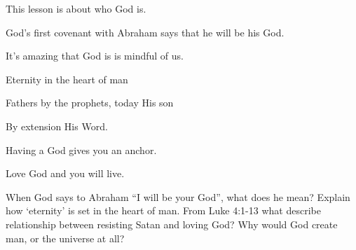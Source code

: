 \begin{discussion}

This lesson is about who God is.

 God's first covenant with Abraham says that he will be his God.


	 It's amazing that God is is mindful of us.


	 Eternity in the heart of man

   Fathers by the prophets, today His son
	
	By extension His Word.


	 Having a God gives you an anchor. 
	
	 Love God and you will live.

\end{discussion}

\begin{questions}
\q When God says to Abraham ``I will be your God'', what does he mean?
\q Explain how `eternity' is set in the heart of man.
\q From Luke 4:1-13 what describe relationship between resisting Satan and loving God?
\q Why would God create man, or the universe at all?
\end{questions}